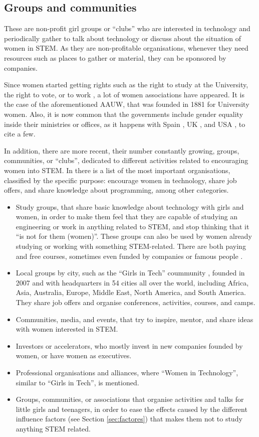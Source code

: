 \documentclass[journal,transmag]{IEEEtran}
\begin{document}
\subsection{Groups and communities}

These are non-profit girl groups or ``clubs'' who are interested in technology and periodically gather to talk about technology or discuss about the situation of women in STEM. As they are non-profitable organisations, whenever they need resources such as places to gather or material, they can be sponsored by companies.

Since women started getting rights such as the right to study at the University, the right to vote, or to work \cite{glover1995women}, a lot of women associations have appeared. It is the case of the aforementioned AAUW, that was founded in 1881 for University women. Also, it is now common that the governments include gender equality inside their ministries or offices, as it happens with Spain \cite{inmujer:site}, UK \cite{ukgequ:site}, and USA \cite{uswomen:site, aauw:site}, to cite a few.

In addition, there are more recent, their number constantly growing, groups, communities, or ``clubs'', dedicated to different activities related to encouraging women into STEM. In \cite{kira2012} there is a list of the most important organisations, classified by the specific purpose: encourage women in technology, share job offers, and share knowledge about programming, among other categories.

\begin{itemize}
	\item Study groups, that share basic knowledge about technology with girls and women, in order to make them feel that they are capable of studying an engineering or work in anything related to STEM, and stop thinking that it ``is not for them (women)''. These groups can also be used by women already studying or working with something STEM-related. There are both paying and free courses, sometimes even funded by companies or famous people \cite{karliek2012}.
	\item Local groups by city, such as the ``Girls in Tech'' coummunity \cite{git:site}, founded in 2007 and with headquarters in 54 cities all over the world, including Africa, Asia, Australia, Europe, Middle East, North America, and South America. They share job offers and organise conferences, activities, courses, and camps.
	\item Communities, media, and events, that try to inspire, mentor, and share ideas with women interested in STEM.
	\item Investors or accelerators, who mostly invest in new companies founded by women, or have women as executives.
	\item Professional organisations and alliances, where ``Women in Technology'', similar to ``Girls in Tech'', is mentioned.
	\item Groups, communities, or associations that organise activities and talks for little girls and teenagers, in order to ease the effects caused by the different influence factors (see Section \ref{sec:factores}) that makes them not to study anything STEM related.
\end{itemize}
\end{document}
